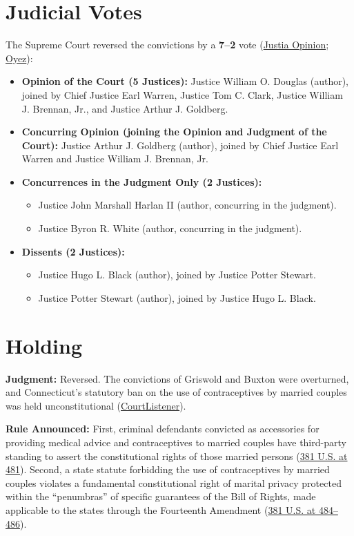 \documentclass[12pt]{article}
\begin{document}
\section{Judicial Votes}
The Supreme Court reversed the convictions by a \textbf{7--2} vote (\href{https://supreme.justia.com/cases/federal/us/381/479/}{Justia Opinion}; \href{https://www.oyez.org/cases/1964/496}{Oyez}):
\begin{itemize}
    \item \textbf{Opinion of the Court (5 Justices):} Justice William O. Douglas (author), joined by Chief Justice Earl Warren, Justice Tom C. Clark, Justice William J. Brennan, Jr., and Justice Arthur J. Goldberg.
    \item \textbf{Concurring Opinion (joining the Opinion and Judgment of the Court):} Justice Arthur J. Goldberg (author), joined by Chief Justice Earl Warren and Justice William J. Brennan, Jr.
    \item \textbf{Concurrences in the Judgment Only (2 Justices):}
    \begin{itemize}
        \item Justice John Marshall Harlan II (author, concurring in the judgment).
        \item Justice Byron R. White (author, concurring in the judgment).
    \end{itemize}
    \item \textbf{Dissents (2 Justices):}
    \begin{itemize}
        \item Justice Hugo L. Black (author), joined by Justice Potter Stewart.
        \item Justice Potter Stewart (author), joined by Justice Hugo L. Black.
    \end{itemize}
\end{itemize}

\section{Holding}
\textbf{Judgment:} Reversed. The convictions of Griswold and Buxton were overturned, and Connecticut's statutory ban on the use of contraceptives by married couples was held unconstitutional (\href{https://www.courtlistener.com/opinion/107082/griswold-v-connecticut/}{CourtListener}).

\textbf{Rule Announced:} First, criminal defendants convicted as accessories for providing medical advice and contraceptives to married couples have third-party standing to assert the constitutional rights of those married persons (\href{https://supreme.justia.com/cases/federal/us/381/479/}{381 U.S. at 481}). Second, a state statute forbidding the use of contraceptives by married couples violates a fundamental constitutional right of marital privacy protected within the ``penumbras'' of specific guarantees of the Bill of Rights, made applicable to the states through the Fourteenth Amendment (\href{https://supreme.justia.com/cases/federal/us/381/479/}{381 U.S. at 484--486}).
\end{document}
